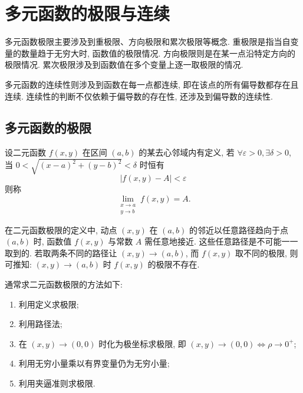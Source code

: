 \section{多元函数的极限与连续}

多元函数极限主要涉及到重极限、方向极限和累次极限等概念. 重极限是指当自变量的数量趋于无穷大时, 函数值的极限情况. 方向极限则是在某一点沿特定方向的极限情况. 累次极限涉及到函数值在多个变量上逐一取极限的情况. 

多元函数的连续性则涉及到函数在每一点都连续, 即在该点的所有偏导数都存在且连续. 连续性的判断不仅依赖于偏导数的存在性, 还涉及到偏导数的连续性. 

\subsection{多元函数的极限}

\begin{definition}[二元函数的极限]
    设二元函数 $ f(x, y) $ 在区间 $ (a, b) $ 的某去心邻域内有定义, 
    若 $ \forall \varepsilon>0, \exists \delta>0 $, 当 $ 0<\sqrt{(x-a)^{2}+(y-b)^{2}}<\delta $ 时恒有
    $$|f(x, y)-A|<\varepsilon$$
    则称
    $$\lim _{\substack{x \rightarrow a \\ y \rightarrow b}} f(x, y)=A.$$
\end{definition}

在二元函数极限的定义中, 动点 $ (x, y) $ 在 $ (a, b) $ 的邻近以任意路径趋向于点 $ (a, b) $ 时, 函数值 $ f(x, y) $ 与常数 $ A $ 需任意地接近.
这些任意路径是不可能一一取到的. 若取两条不同的路径让 $ (x, y) \rightarrow(a, b) $, 而 $ f(x, y) $ 取不同的极限, 
则可推知: $ (x, y) \rightarrow(a, b) $ 时 $ f(x, y) $ 的极限不存在.

通常求二元函数极限的方法如下:
\begin{enumerate}[label=(\arabic{*})]
    \item 利用定义求极限;
    \item 利用路径法;
    \item 在 $ (x, y) \rightarrow(0,0) $ 时化为极坐标求极限, 即 $ (x, y) \rightarrow(0,0) \Leftrightarrow \rho \rightarrow 0^+ $;
    \item 利用无穷小量乘以有界变量仍为无穷小量;
    \item 利用夹逼准则求极限.
\end{enumerate}

